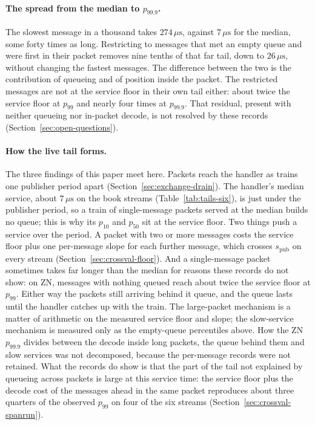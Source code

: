 \documentclass[11pt]{article}
\newcommand{\spub}{s_{\mathrm{pub}}}
\begin{document}
\paragraph{The spread from the median to $p_{99.9}$.} The slowest message in a thousand
takes $274\,\mu\mathrm{s}$, against $7\,\mu\mathrm{s}$ for the median, some forty times as
long. Restricting to messages that met an empty queue and were first in their packet
removes nine tenths of that far tail, down to $26\,\mu\mathrm{s}$, without changing the
fastest messages. The difference between the two is the contribution of queueing and of
position inside the packet. The restricted messages are not at the service floor in their
own tail either: about twice the service floor at $p_{99}$ and nearly four times at
$p_{99.9}$. That residual, present with neither queueing nor in-packet decode, is not
resolved by these records (Section~\ref{sec:open-questions}).

\paragraph{How the live tail forms.} The three findings of this paper meet here. Packets
reach the handler as trains one publisher period apart
(Section~\ref{sec:exchange-drain}). The handler's median service, about $7\,\mu\mathrm{s}$
on the book streams (Table~\ref{tab:tails-six}), is just under the publisher period, so a train of single-message packets served at the median builds no queue; this
is why its $p_{10}$ and $p_{50}$ sit at the service floor. Two things push a service over the period. A packet with two or more messages costs the service floor plus one per-message slope for
each further message, which crosses $\spub$ on every stream
(Section~\ref{sec:crossval-floor}). And a single-message packet sometimes takes far longer
than the median for reasons these records do not show: on ZN, messages with nothing queued
reach about twice the service floor at $p_{99}$. Either way the packets still arriving behind it queue,
and the queue lasts until the handler catches up with the train. The large-packet
mechanism is a matter of arithmetic on the measured service floor and slope; the slow-service
mechanism is measured only as the empty-queue percentiles above. How the ZN $p_{99.9}$
divides between the decode inside long packets, the queue behind them and
slow services was not decomposed, because the per-message records were not retained.
What the records do show is that the part of the tail not explained by queueing across
packets is large at this service time: the service floor plus the decode cost of the messages
ahead in the same packet reproduces about three quarters of the observed $p_{99}$ on four of
the six streams (Section~\ref{sec:crossval-spanrun}).
\end{document}
